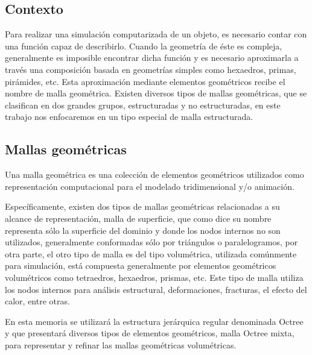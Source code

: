 \subsection{Contexto}

Para realizar una simulación computarizada de un objeto, es necesario contar con una función capaz de describirlo. Cuando la geometría de éste es compleja, generalmente es imposible encontrar dicha función y es necesario aproximarla a través una composición basada en geometrías simples como hexaedros, primas, pirámides, etc. Esta aproximación mediante elementos geométricos recibe el nombre de malla geométrica.
Existen diversos tipos de mallas geométricas, que se clasifican en dos grandes grupos, estructuradas y no estructuradas, en este trabajo nos enfocaremos en un tipo especial de malla estructurada.
\subsection{Mallas geométricas}

Una malla geométrica es una colección de elementos geométricos utilizados como representación computacional para el modelado tridimensional y/o animación.

Específicamente, existen dos tipos de mallas geométricas relacionadas a su alcance de representación, malla de superficie, que como dice su nombre representa sólo la superficie del dominio y donde los nodos internos no son utilizados, generalmente conformadas sólo por triángulos o paralelogramos, por otra parte, el otro tipo de malla es del tipo volumétrica, utilizada comúnmente para simulación, está compuesta generalmente por elementos geométricos volumétricos como tetraedros, hexaedros, prismas, etc. Este tipo de malla utiliza los nodos internos para análisis estructural, deformaciones, fracturas, el efecto del calor, entre otras.


En esta memoria se utilizará la estructura jerárquica regular denominada Octree y que presentará diversos tipos de elementos geométricos, malla Octree mixta, para representar y refinar las mallas geométricas volumétricas.

